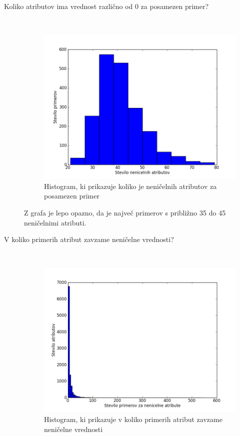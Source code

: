 \documentclass[a4paper,11pt]{article}
\begin{document}
\begin{description}
\item[Koliko atributov ima vrednost različno od 0 za posamezen primer?] \hfill \\
\begin{figure}[h!]
\begin{center}
\includegraphics[scale=0.5]{statPrimeri.png}
\caption{Histogram, ki prikazuje koliko je neničelnih atributov za posamezen primer}
\label{slika1}
\end{center}
\end{figure}

Z grafa je lepo opazno, da je največ primerov s približno 35 do 45 neničelnimi atributi. 

\item[V koliko primerih atribut zavzame neničelne vrednosti?] \hfill \\
\begin{figure}[h!]
\begin{center}
\includegraphics[scale=0.5]{statAttr.png}
\caption{Histogram, ki prikazuje v koliko primerih atribut zavzame neničelne vrednosti}
\label{slika2}
\end{center}
\end{figure}


\end{description}
\end{document}
